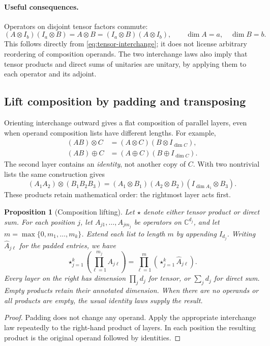 \documentclass[11pt,a4paper]{article}
\newcommand{\C}{\mathbb C}
\newtheorem{proposition}{Proposition}
\begin{document}
\paragraph{Useful consequences.}
Operators on disjoint tensor factors commute:
\[
 (A\otimes I_b)(I_a\otimes B)
   =A\otimes B
   =(I_a\otimes B)(A\otimes I_b),
 \qquad \dim A=a,\quad\dim B=b.
\]
This follows directly from \eqref{eq:tensor-interchange}; it does not
license arbitrary reordering of composition operands.
The two interchange laws also imply that tensor products and direct
sums of unitaries are unitary, by applying them to each operator and
its adjoint.

\subsection{Lift composition by padding and transposing}

\label{sec:lifting}

Orienting interchange outward gives a flat composition of parallel
layers, even when operand composition lists have different lengths. For example,
\begin{align*}
 (AB)\otimes C&=(A\otimes C)(B\otimes I_{\dim C}),\\
 (AB)\oplus C&=(A\oplus C)(B\oplus I_{\dim C}).
\end{align*}
The second layer contains an \emph{identity}, not another copy of $C$.
With two nontrivial lists the same construction gives
\[
 (A_1A_2)\otimes(B_1B_2B_3)
 =(A_1\otimes B_1)(A_2\otimes B_2)(I_{\dim A_1}\otimes B_3).
\]
These products retain mathematical order: the rightmost layer acts first.

\par\noindent\begin{minipage}{\linewidth}
\begin{proposition}[Composition lifting]
Let $\star$ denote either tensor product or direct sum. For each position
$j$, let $A_{j1},\ldots,A_{jm_j}$ be operators on $\C^{d_j}$, and let
$m=\max\{0,m_1,\ldots,m_k\}$. Extend each list to length $m$ by appending $I_{d_j}$.
Writing $\widehat A_{j\ell}$ for the padded entries, we have
\[
 \mathop{\star}_{j=1}^k\left(\prod_{\ell=1}^{m_j}A_{j\ell}\right)
 =\prod_{\ell=1}^m\left(\mathop{\star}_{j=1}^k\widehat A_{j\ell}\right).
\]
Every layer on the right has dimension $\prod_j d_j$ for tensor, or
$\sum_j d_j$ for direct sum. Empty products retain their annotated
dimension. When there are no operands or all products are empty, the
usual identity laws supply the result.
\end{proposition}
\begin{proof}
Padding does not change any operand. Apply the appropriate interchange
law repeatedly to the right-hand product of layers. In each position
the resulting product is the original operand followed by identities.
\end{proof}
\end{minipage}\par
\end{document}
